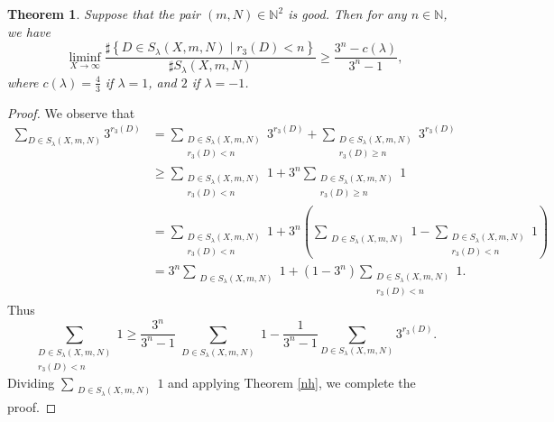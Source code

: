 \documentclass[10pt,a4paper]{amsart}
\newtheorem{theorem}{Theorem}
\begin{document}
\begin{theorem}\label{be}
Suppose that the pair $(m,N)\in\mathbb{N}^2$ is good. Then
 for any $n \in \mathbb{N}$, we have
\begin{equation}\label{1}
    \liminf_{X \rightarrow \infty} \frac{\sharp\left\{D \in S_{\lambda}(X, m, N) \mid r_{3}(D) <n \right\}}{\sharp S_{\lambda}(X, m, N)} \ge\frac{3^n-c(\lambda) }{3^{n}-1},
\end{equation}
where $c(\lambda)=\frac{4}{3}$ if $\lambda=1$, and $2$ if $\lambda=-1$.
\end{theorem}

\begin{proof}
We observe that
\[
\begin{aligned}
 \sum_{D \in S_{\lambda}(X, m, N)} 3^{r_{3}(D)}
& =\sum_{\substack{D \in S_{\lambda}(X, m, N) \\
r_{3}(D)<n}} 3^{r_{3}(D)}+\sum_{\substack{D \in S_{\lambda}(X, m, N) \\
r_{3}(D) \geq n}} 3^{r_{3}(D)} \\
& \ge \sum_{\substack{D \in S_{\lambda}(X, m, N) \\
r_{3}(D)<n}} 1+3^n\sum_{\substack{D \in S_{\lambda}(X, m, N) \\
r_{3}(D) \geq n}} 1\\
&=\sum_{\substack{D \in S_{\lambda}(X, m, N) \\
r_{3}(D)<n}} 1+3^n\left(\sum_{\substack{D \in S_{\lambda}(X, m, N) }} 1-\sum_{\substack{D \in S_{\lambda}(X, m, N) \\
r_{3}(D) < n}} 1\right)\\
&=3^n\sum_{\substack{D \in S_{\lambda}(X, m, N) }} 1+(1-3^n)\sum_{\substack{D \in S_{\lambda}(X, m, N) \\
r_{3}(D) < n}} 1.
\end{aligned}
\]
Thus
\[ \sum_{\substack{D \in S_{\lambda}(X, m, N) \\
r_{3}(D) < n}} 1
\ge \frac{3^n}{3^n-1}\sum_{\substack{D \in S_{\lambda}(X, m, N) }} 1-\frac{1}{3^n-1}\sum_{D \in S_{\lambda}(X, m, N)} 3^{r_{3}(D)}.\]
Dividing $\sum_{\substack{D \in S_{\lambda}(X, m, N) }}1$ and applying Theorem \ref{nh}, we complete the proof.

\end{proof}
\end{document}

